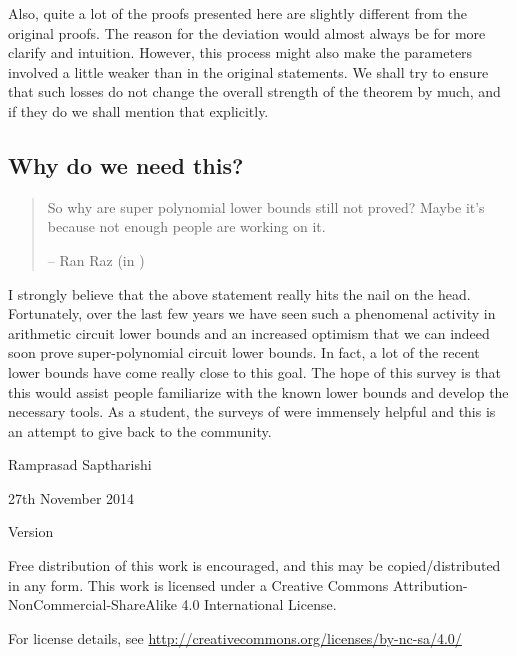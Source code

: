 Also, quite a lot of the proofs presented here are slightly different from the original proofs. The reason for the deviation would almost always be for more clarify and intuition. However, this process might also make the parameters involved a little weaker than in the original statements. We shall try to ensure that such losses do not change the overall strength of the theorem by much, and if they do we shall mention that explicitly. \\

\subsection*{Why do we need this?}

\begin{quote}
So why are super polynomial lower bounds still not proved?  Maybe it's because not enough people are working on it.  
\begin{flushright}
-- Ran Raz (in \cite{raz10fool})
\end{flushright}
\end{quote}


I strongly believe that the above statement really hits the nail on the head. Fortunately, over the last few years we have seen such a phenomenal activity in arithmetic circuit lower bounds and an increased optimism that we can indeed soon prove super-polynomial circuit lower bounds. In fact, a lot of the recent lower bounds have come really close to this goal. The hope of this survey is that this would assist people familiarize with the known lower bounds and develop the necessary tools. As a student, the surveys of \cite{sy,ckw11} were immensely helpful and this is an attempt to give back to the community. 

\vspace*{2cm}

\noindent
Ramprasad Saptharishi

\noindent
27th November 2014

\noindent 
Version \currentversion\\

\noindent
\ccbyncsa

\medskip

\noindent
Free distribution of this work is encouraged, and this may be
copied/distributed in any form. This work is licensed under a Creative
Commons Attribution-NonCommercial-ShareAlike 4.0 International
License.

For license details, see \url{http://creativecommons.org/licenses/by-nc-sa/4.0/}


